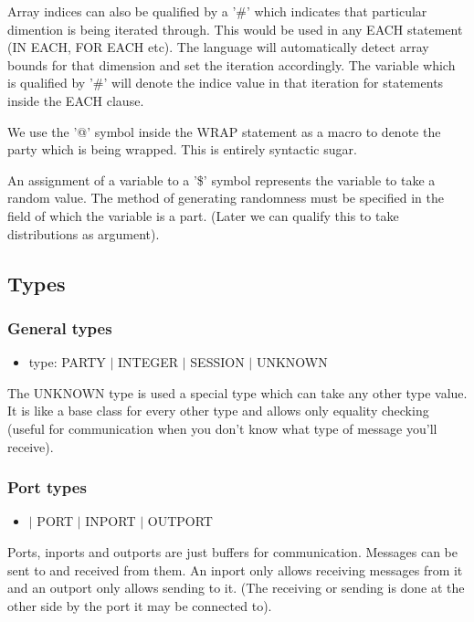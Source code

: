 \documentclass{article}
\begin{document}
Array indices can also be qualified by a '\#' which indicates that particular dimention is being iterated through. This would be used in any EACH statement (IN EACH, FOR EACH etc). The language will automatically detect array bounds for that dimension and set the iteration accordingly. The variable which is qualified by '\#' will denote the indice value in that iteration for statements inside the EACH clause.

We use the '@' symbol inside the WRAP statement as a macro to denote the party which is being wrapped. This is entirely syntactic sugar.

An assignment of a variable to a '\$' symbol represents the variable to take a random value. The method of generating randomness must be specified in the field of which the variable is a part. (Later we can qualify this to take distributions as argument).

\subsection{Types}

\subsubsection{General types}
\begin{itemize}
\item type: PARTY $|$ INTEGER $|$ SESSION $|$ UNKNOWN 
\end{itemize}

The UNKNOWN type is used a special type which can take any other type value. It is like a base class for every other type and allows only equality checking (useful for communication when you don't know what type of message you'll receive).

\subsubsection{Port types}
\begin{itemize}
\item $|$ PORT $|$ INPORT $|$ OUTPORT
\end{itemize}
Ports, inports and outports are just buffers for communication. Messages can be sent to and received from them. An inport only allows receiving messages from it and an outport only allows sending to it. (The receiving or sending is done at the other side by the port it may be connected to).
\end{document}
